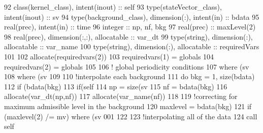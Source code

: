 \begin{DoxyCode}
92     \textcolor{keywordtype}{class}(kernel\_class), \textcolor{keywordtype}{intent(inout)} :: self
93     \textcolor{keywordtype}{type}(stateVector\_class), \textcolor{keywordtype}{intent(inout)} :: sv
94     \textcolor{keywordtype}{type}(background\_class), \textcolor{keywordtype}{dimension(:)}, \textcolor{keywordtype}{intent(in)} :: bdata
95     \textcolor{keywordtype}{real(prec)}, \textcolor{keywordtype}{intent(in)} :: time
96     \textcolor{keywordtype}{integer} :: np, nf, bkg
97     \textcolor{keywordtype}{real(prec)} :: maxLevel(2)
98     \textcolor{keywordtype}{real(prec)}, \textcolor{keywordtype}{dimension(:,:)}, \textcolor{keywordtype}{allocatable} :: var\_dt
99     \textcolor{keywordtype}{type}(string), \textcolor{keywordtype}{dimension(:)}, \textcolor{keywordtype}{allocatable} :: var\_name
100     \textcolor{keywordtype}{type}(string), \textcolor{keywordtype}{dimension(:)}, \textcolor{keywordtype}{allocatable} :: requiredVars
101 
102     \textcolor{keyword}{allocate}(requiredvars(2))
103     requiredvars(1) = globals%
104     requiredvars(2) = globals%
105         
106     \textcolor{comment}{! global periodicity conditions}
107     \textcolor{keywordflow}{where} (sv%
108     \textcolor{keywordflow}{where} (sv%
109 
110     \textcolor{comment}{!interpolate each background}
111     \textcolor{keywordflow}{do} bkg = 1, \textcolor{keyword}{size}(bdata)
112         \textcolor{keywordflow}{if} (bdata(bkg)%
113             \textcolor{keywordflow}{if}(self%
114                 np = \textcolor{keyword}{size}(sv%
115                 nf = bdata(bkg)%
116                 \textcolor{keyword}{allocate}(var\_dt(np,nf))
117                 \textcolor{keyword}{allocate}(var\_name(nf))
118 
119                 \textcolor{comment}{!correcting for maximum admissible level in the background}
120                 maxlevel = bdata(bkg)%
121                 \textcolor{keywordflow}{if} (maxlevel(2) /= mv) \textcolor{keywordflow}{where} (sv%
      001
122 
123                 \textcolor{comment}{!interpolating all of the data}
124                 \textcolor{keyword}{call }self%

\end{DoxyCode}
